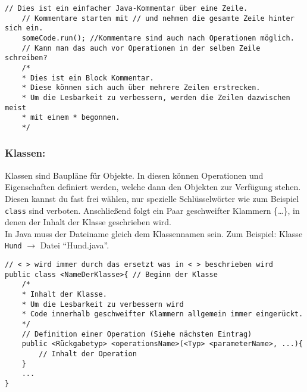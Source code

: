 \begin{lstlisting}[title=\textbf{Beispiel: Kommentare}]
	// Dies ist ein einfacher Java-Kommentar über eine Zeile.
	// Kommentare starten mit // und nehmen die gesamte Zeile hinter sich ein.
	someCode.run(); //Kommentare sind auch nach Operationen möglich.
	// Kann man das auch vor Operationen in der selben Zeile schreiben?
	/*
	* Dies ist ein Block Kommentar.
	* Diese können sich auch über mehrere Zeilen erstrecken.
	* Um die Lesbarkeit zu verbessern, werden die Zeilen dazwischen meist
	* mit einem * begonnen.
	*/
\end{lstlisting}

\begin{Infobox}
	\subsubsection*{Klassen:}
	Klassen sind Baupläne für Objekte.
	In diesen können Operationen und Eigenschaften definiert werden, welche dann den Objekten zur Verfügung stehen.\\
	Diesen kannst du fast frei wählen, nur spezielle Schlüsselwörter wie zum Beispiel \lstinline{class} sind verboten.
	Anschließend folgt ein Paar geschweifter Klammern \{\dots\}, in denen der Inhalt der Klasse geschrieben wird.\\
	In Java muss der Dateiname gleich dem Klassennamen sein. Zum Beispiel: Klasse \lstinline{Hund} $\rightarrow$ Datei \enquote{Hund.java}.
\end{Infobox}

\begin{lstlisting}[title=\textbf{Java Klassen Syntax}]
// < > wird immer durch das ersetzt was in < > beschrieben wird
public class <NameDerKlasse>{ // Beginn der Klasse
	/*
	* Inhalt der Klasse.
	* Um die Lesbarkeit zu verbessern wird
	* Code innerhalb geschweifter Klammern allgemein immer eingerückt.
	*/
	// Definition einer Operation (Siehe nächsten Eintrag)
	public <Rückgabetyp> <operationsName>(<Typ> <parameterName>, ...){
		// Inhalt der Operation
	}
	...
}
\end{lstlisting}


